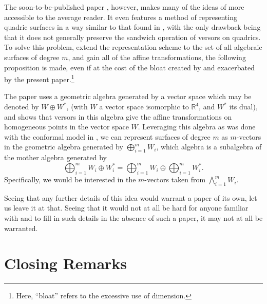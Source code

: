\documentclass{birkjour}
\theoremstyle{definition}
\theoremstyle{remark}
\numberwithin{equation}{section}
\newcommand{\R}{\mathbb{R}}
\begin{document}
The soon-to-be-published paper \cite{GoldmanNotYet}, however, makes many of the ideas of \cite{DoranHestenes93} more
accessible to the average reader.  It even features a method of representing quadric
surfaces in a way similar to that found in \cite{Parkin13}, with the only drawback being
that it does not generally preserve the sandwich operation of versors on quadrics.  To solve this problem,
extend the representation scheme to the set of all algebraic surfaces of degree $m$, and gain
all of the affine transformations, the following proposition is made, even if at the cost of the
bloat created by \cite{Parkin13} and exacerbated by the present paper.\footnote{Here, ``bloat'' refers
to the excessive use of dimension.}

The paper \cite{GoldmanNotYet} uses a geometric algebra generated by a vector space which may
be denoted by $W\oplus W^*$,
(with $W$ a vector space isomorphic to $\R^4$, and $W^*$ its dual), and shows that versors
in this algebra give the affine transformations on homogeneous points in the vector space $W$.
Leveraging this algebra as was done with the conformal model in \cite{Parkin13}, we can represent
surfaces of degree $m$ as $m$-vectors in the geometric algebra generated by $\bigoplus_{i=1}^m W_i$, which
algebra is a subalgebra of the mother algebra generated by
\begin{equation*}
\bigoplus_{i=1}^m W_i\oplus W_i^* = \bigoplus_{i=1}^m W_i\oplus\bigoplus_{i=1}^m W_i^*.
\end{equation*}
Specifically, we would be interested in the $m$-vectors taken from $\bigwedge_{i=1}^m W_i$.

Seeing that any further
details of this idea would warrant a paper of its own, let us leave it at that.  Seeing that it would not at all be hard for
anyone familiar with \cite{Parkin13} and \cite{GoldmanNotYet} to fill in such details in the absence of such a paper,
it may not at all be warranted.

\section{Closing Remarks}
\end{document}
